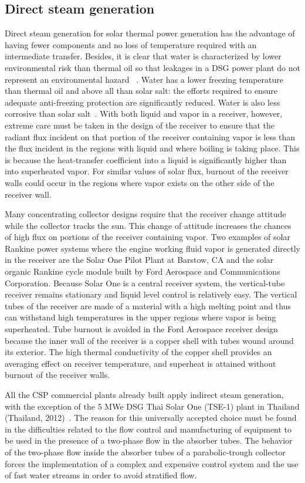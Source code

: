 \subsection{Direct steam generation}
Direct steam generation for solar thermal power generation has the advantage of having fewer components and no loss of temperature required with an intermediate transfer.  Besides, it is clear that water is characterized by lower environmental risk than thermal oil so that leakages in a DSG power plant do not represent an environmental hazard ~\cite{Fernandez2010}. Water has a lower freezing temperature than thermal oil and above all than solar salt: the efforts required to ensure adequate anti-freezing protection are significantly reduced. Water is also less corrosive than solar salt~\cite{Giglio2017}. With both liquid and vapor in a receiver, however, extreme care must be taken in the design of the receiver to ensure that the radiant flux incident on that portion of the receiver containing vapor is less than the flux incident in the regions with liquid and where boiling is taking place. This is because the heat-transfer coefficient into a liquid is significantly higher than into superheated vapor. For similar values of solar flux, burnout of the receiver walls could occur in the regions where vapor exists on the other side of the receiver wall.

Many concentrating collector designs require that the receiver change attitude while the collector tracks the sun. This change of attitude increases the chances of high flux on portions of the receiver containing vapor.
Two examples of solar Rankine power systems where the engine working fluid vapor is generated directly in the receiver are the Solar One Pilot Plant at Barstow, CA and the solar organic Rankine cycle module built by Ford Aerospace and Communications Corporation. Because Solar One is a central receiver system, the vertical-tube receiver remains stationary and liquid level control is relatively easy. The vertical tubes of the receiver are made of a material with a high melting point and thus can withstand high temperatures in the upper regions where vapor is being superheated. Tube burnout is avoided in the Ford Aerospace receiver design because the inner wall of the receiver is a copper shell with tubes wound around its exterior. The high thermal conductivity of the copper shell provides an averaging effect on receiver temperature, and superheat is attained without burnout of the receiver walls.

All the CSP commercial plants already built apply indirect steam generation, with the exception of the 5 MWe DSG Thai Solar One (TSE-1) plant in Thailand (Thailand, 2012)~\cite{Khenissi2015}. The reason for this universally accepted choice must be found in the difficulties related to the flow control and manufacturing of equipment to be used in the presence of a two-phase flow in the absorber tubes. The behavior of the two-phase flow inside the absorber tubes of a parabolic-trough collector forces the implementation of a complex and expensive control system and the use of fast water streams in order to avoid stratified flow.

